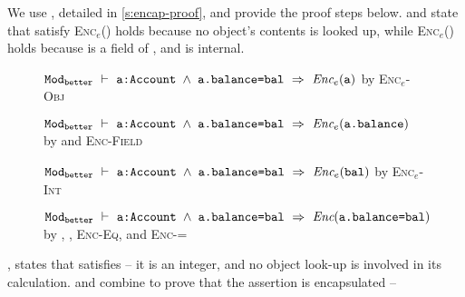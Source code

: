 We use , detailed in  \ref{s:encap-proof}, 
and provide the proof steps below.
\textbf{} and \textbf{} state that 
 satisfy 
\textsc{Enc}$_e$() holds because no object's contents is looked up,
while \textsc{Enc}$_e$() holds because  is a field of , and  is
internal.
\\
\begin{figure}[h]
\begin{proofexample}
	{\begin{proofexample}
			{\proofstepwithrule
			{${\texttt{Mod}}_{{\texttt{better}}}\ \vdash\ {\texttt{a:Account $\wedge$ a.balance=bal}}\ \Rightarrow\ \textit{Enc$_e$}({\texttt{a}})$}
				{by \textsc{Enc$_e$-Obj}}
		}
		\endproofsteps
	\end{proofexample}
		}
	{\begin{proofexample}
		\proofsteps{\prg{balanceEnc}}
			{\proofstepwithrule
			{${\texttt{Mod}}_{{\texttt{better}}}\ \vdash\ {\texttt{a:Account $\wedge$ a.balance=bal}}\ \Rightarrow\ \textit{Enc$_e$}({\texttt{a.balance}})$}
				{by  and \textsc{Enc-Field}}
		}
		\endproofsteps
	\end{proofexample}
		}
	{\begin{proofexample}
		\proofsteps{\prg{balEnc}}
			{\proofstepwithrule
			{${\texttt{Mod}}_{{\texttt{better}}}\ \vdash\ {\texttt{a:Account $\wedge$ a.balance=bal}}\ \Rightarrow\ \textit{Enc$_e$}({\texttt{bal}})$}
				{by \textsc{Enc$_e$-Int}}
		}
		\endproofsteps
	\end{proofexample}
		}
		{\proofstepwithrule
			{
			${\texttt{Mod}}_{{\texttt{better}}}\ \vdash\ {\texttt{a:Account $\wedge$ a.balance=bal}}\ \Rightarrow\ \textit{Enc}({\texttt{a.balance=bal}})$
			}{by , , \textsc{Enc-Eq}, and \textsc{Enc-=}}}
\endproofsteps
\end{proofexample}
\end{figure}


,  \textbf{} states that  satisfies 
-- it is an integer, and no object look-up is involved in its calculation.
\textbf{} and \textbf{} combine to prove that the assertion  is encapsulated --



